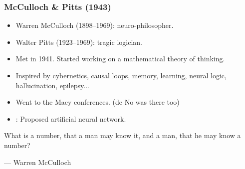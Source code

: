 \documentclass{beamer}
\begin{document}
\begin{frame}
\frametitle{McCulloch \& Pitts (1943)}
\begin{itemize}
    \item Warren McCulloch (1898--1969): neuro-philosopher.
    \item Walter Pitts (1923--1969): tragic logician.
    \item Met in 1941. Started working on a mathematical theory of thinking.
    \item Inspired by cybernetics, causal loops, memory, learning, neural logic, hallucination, epilepsy...
    \item Went to the Macy conferences. (de No was there too)
    \item \cite{mccullochLogicalCalculusIdeas1943}: Proposed artificial neural network.
\end{itemize}
\begin{displayquote}
    What is a number, that a man may know it, and a man, that he may know a number?

    --- Warren McCulloch
\end{displayquote}

\end{frame}
\end{document}
